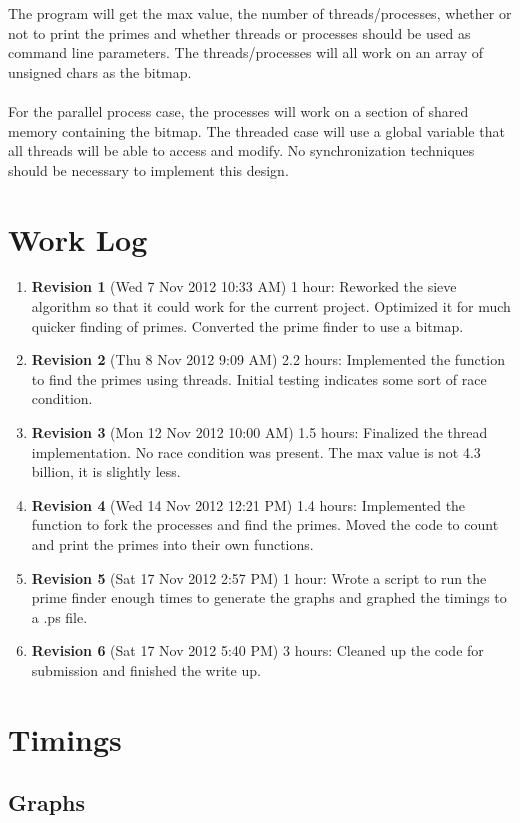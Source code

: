 \documentclass{article}
\begin{document}
The program will get the max value, the number of threads/processes, whether or not to print the primes and whether threads or processes should be used as command line parameters.  The threads/processes will all work on an array of unsigned chars as the bitmap.\\\\

For the parallel process case, the processes will work on a section of shared memory containing the bitmap.  The threaded case will use a global variable that all threads will be able to access and modify. No synchronization techniques should be necessary to implement this design.

\section{Work Log}
\begin{enumerate}
\item \textbf{Revision 1} (Wed 7 Nov 2012 10:33 AM) 1 hour:  Reworked the sieve algorithm so that it could work for the current project.  Optimized it for much quicker finding of primes.  Converted the prime finder to use a bitmap.
\item \textbf{Revision 2} (Thu 8 Nov 2012 9:09 AM) 2.2 hours:  Implemented the function to find the primes using threads.  Initial testing indicates some sort of race condition.
\item \textbf{Revision 3} (Mon 12 Nov 2012 10:00 AM) 1.5 hours:  Finalized the thread implementation.  No race condition was present.  The max value is not 4.3 billion, it is slightly less.
\item \textbf{Revision 4} (Wed 14 Nov 2012 12:21 PM) 1.4 hours:  Implemented the function to fork the processes and find the primes.  Moved the code to count and print the primes into their own functions.
\item \textbf{Revision 5} (Sat 17 Nov 2012 2:57 PM) 1 hour:  Wrote a script to run the prime finder enough times to generate the graphs and graphed the timings to a .ps file.
\item \textbf{Revision 6} (Sat 17 Nov 2012 5:40 PM) 3 hours:  Cleaned up the code for submission and finished the write up.
\end{enumerate}

\section{Timings}
\subsection{Graphs}
\end{document}
